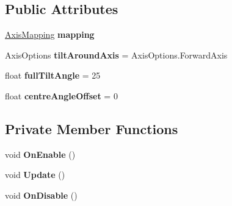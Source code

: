 \subsection*{Public Attributes}
\begin{DoxyCompactItemize}
\item 
\mbox{\label{class_unity_standard_assets_1_1_cross_platform_input_1_1_tilt_input_a825e259327ff4204d651876bb30d22f9}} 
\hyperlink{class_unity_standard_assets_1_1_cross_platform_input_1_1_tilt_input_1_1_axis_mapping}{Axis\+Mapping} {\bfseries mapping}
\item 
\mbox{\label{class_unity_standard_assets_1_1_cross_platform_input_1_1_tilt_input_ad83fbef4affa001aab207586dd91e2e7}} 
Axis\+Options {\bfseries tilt\+Around\+Axis} = Axis\+Options.\+Forward\+Axis
\item 
\mbox{\label{class_unity_standard_assets_1_1_cross_platform_input_1_1_tilt_input_a92a6ef18b52f2409658b7a50037ac831}} 
float {\bfseries full\+Tilt\+Angle} = 25
\item 
\mbox{\label{class_unity_standard_assets_1_1_cross_platform_input_1_1_tilt_input_aac904601039bbf6561ee00f0d492c941}} 
float {\bfseries centre\+Angle\+Offset} = 0
\end{DoxyCompactItemize}
\subsection*{Private Member Functions}
\begin{DoxyCompactItemize}
\item 
\mbox{\label{class_unity_standard_assets_1_1_cross_platform_input_1_1_tilt_input_aa7335a4f6c00d866ef0e4ba28a2785ba}} 
void {\bfseries On\+Enable} ()
\item 
\mbox{\label{class_unity_standard_assets_1_1_cross_platform_input_1_1_tilt_input_a31e3f64d3b99ef46ee1ecd209d18c787}} 
void {\bfseries Update} ()
\item 
\mbox{\label{class_unity_standard_assets_1_1_cross_platform_input_1_1_tilt_input_a07f227c591fc54fd128d5d7be71c6871}} 
void {\bfseries On\+Disable} ()
\end{DoxyCompactItemize}
